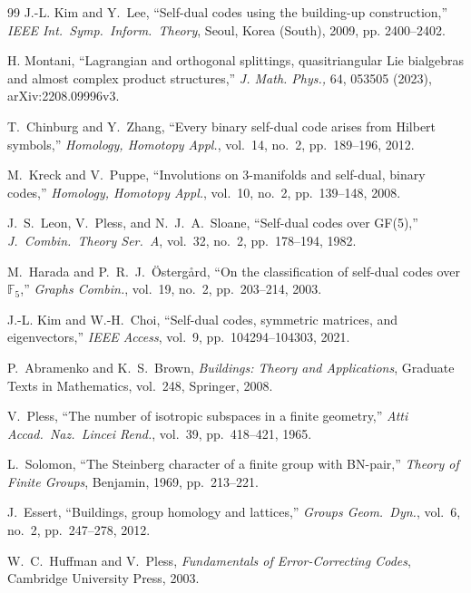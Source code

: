 \documentclass[12pt]{article}
\begin{document}
\begin{thebibliography}{99}
J.-L. Kim and Y.~Lee,
``Self-dual codes using the building-up construction,''
\textit{IEEE Int.\ Symp.\ Inform.\ Theory}, Seoul, Korea (South), 2009, pp. 2400--2402.

H. Montani, ``Lagrangian and orthogonal splittings, quasitriangular Lie bialgebras and almost complex product structures,'' \textit{J. Math. Phys.,} 64, 053505 (2023), arXiv:2208.09996v3.


T.~Chinburg and Y.~Zhang,
``Every binary self-dual code arises from Hilbert symbols,''
\textit{Homology, Homotopy Appl.}, vol.~14, no.~2, pp.~189--196, 2012.

M.~Kreck and V.~Puppe,
``Involutions on 3-manifolds and self-dual, binary codes,''
\textit{Homology, Homotopy Appl.}, vol.~10, no.~2, pp.~139--148, 2008.

J.~S.~Leon, V.~Pless, and N.~J.~A.~Sloane,
``Self-dual codes over GF(5),''
\textit{J.\ Combin.\ Theory Ser.~A}, vol.~32, no.~2, pp.~178--194, 1982.

M.~Harada and P.~R.~J.~\"Osterg\r{a}rd,
``On the classification of self-dual codes over $\mathbb{F}_5$,''
\textit{Graphs Combin.}, vol.~19, no.~2, pp.~203--214, 2003.

J.-L. Kim and W.-H.~Choi,
``Self-dual codes, symmetric matrices, and eigenvectors,''
\textit{IEEE Access}, vol.~9, pp.~104294--104303, 2021.

P.~Abramenko and K.~S.~Brown,
\textit{Buildings: Theory and Applications},
Graduate Texts in Mathematics, vol.~248, Springer, 2008.

V.~Pless,
``The number of isotropic subspaces in a finite geometry,''
\textit{Atti Accad.\ Naz.\ Lincei Rend.}, vol.~39, pp.~418--421, 1965.

L.~Solomon,
``The Steinberg character of a finite group with BN-pair,''
\textit{Theory of Finite Groups}, Benjamin, 1969, pp.~213--221.

J.~Essert,
``Buildings, group homology and lattices,''
\textit{Groups Geom.\ Dyn.}, vol.~6, no.~2, pp.~247--278, 2012.

W.~C.~Huffman and V.~Pless,
\textit{Fundamentals of Error-Correcting Codes},
Cambridge University Press, 2003.

\end{thebibliography}
\end{document}
